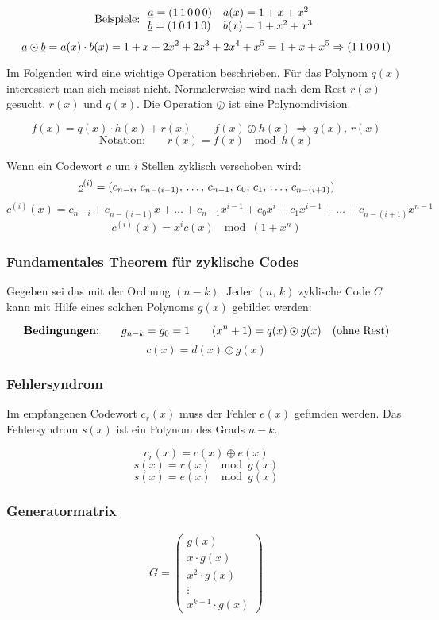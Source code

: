 \documentclass[a4paper]{article}
\begin{document}
\begin{twocolumn}
$$\text{Beispiele:} \: 
\begin{array}{ll}
  \underline{a} = (1\,1\,0\,0\,0) & a(x) = 1 + x + x^2 \\
  \underline{b} = (1\,0\,1\,1\,0) & b(x) = 1 + x^2 + x^3 \\
\end{array}$$
$$\underline{a} \odot \underline{b} = a(x) \cdot b(x) = 1 + x + 2x^2 + 2x^3 + 2x^4 + x^5 = 1 + x + x^5 \Rightarrow (1\,1\,0\,0\,1)$$

Im Folgenden wird eine wichtige Operation beschrieben. 
Für das Polynom $q(x)$ interessiert man sich meisst nicht.
Normalerweise wird nach dem Rest $r(x)$ gesucht. $r(x)$ und $q(x)$.
Die Operation $\oslash$ ist eine Polynomdivision.

$$f(x) = q(x) \cdot h(x) + r(x) \qquad f(x) \oslash h(x) \: \Rightarrow \: q(x), \, r(x) $$
$$\text{Notation:} \qquad r(x) = f(x) \: \mod h(x) $$

Wenn ein Codewort $c$ um $i$ Stellen zyklisch verschoben wird: 
$$\underline{c}^{(i)} = (c_{n-i},\,c_{n-(i-1)},\,\ldots,\,c_{n-1},\,c_0,\,c_1,\,\ldots,\,c_{n-(i+1)})$$
$$c^{(i)}(x) = c_{n-i} + c_{n-(i-1)} x + \ldots + c_{n-1} x^{i-1} + c_0 x^i + c_1 x^{i-1} + \ldots + c_{n-(i+1)}x^{n-1}$$
$$c^{(i)}(x) = x^i c(x) \: \mod \left(1+x^n\right)$$

\subsubsection{Fundamentales Theorem für zyklische Codes}
Gegeben sei das  mit der Ordnung $(n-k)$. 
Jeder $(n,\,k)$ zyklische Code $C$ kann mit Hilfe eines solchen Polynoms $g(x)$ gebildet werden:

$$\text{\textbf{Bedingungen}:} \qquad g_{n-k} = g_0 = 1 \qquad (x^n + 1) = q(x) \odot g(x) \quad \text{(ohne Rest)}$$
$$c(x) = d(x) \odot g(x)$$

\subsubsection{Fehlersyndrom}
Im empfangenen Codewort $c_r(x)$ muss der Fehler $e(x)$ gefunden werden. 
Das Fehlersyndrom $s(x)$ ist ein Polynom des Grads $n-k$.

$$c_r(x) = c(x) \oplus e(x)$$
$$s(x) = r(x) \: \mod g(x)$$
$$s(x) = e(x) \: \mod g(x)$$


\subsubsection{Generatormatrix}
$$G = \left(\begin{array}{c} g(x) \\ x \cdot g(x) \\ x^2 \cdot g(x) \\ \vdots \\ x^{k-1} \cdot g(x) \end{array}\right)$$



\end{twocolumn}
\end{document}

